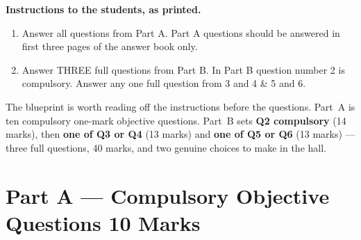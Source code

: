 \documentclass[11pt,a4paper,oneside]{book}
\newenvironment{note}
  {\begin{tcolorbox}[colback=tint,colframe=ocre,boxrule=0.8pt,sharp corners,
     fontupper=\small,breakable,before skip=8pt,after skip=8pt]}
  {\end{tcolorbox}}
\begin{document}
\begin{note}
\textbf{\sffamily Instructions to the students, as printed.}
\begin{enumerate}[leftmargin=1.6em,itemsep=2pt,topsep=4pt]
\item Answer all questions from Part A. Part A questions should be answered in
      first three pages of the answer book only.
\item Answer THREE full questions from Part B. In Part B question number 2 is
      compulsory. Answer any one full question from 3 and 4 \& 5 and 6.
\end{enumerate}
\end{note}

The blueprint is worth reading off the instructions before the questions.
Part~A is ten compulsory one-mark objective questions. Part~B sets
\textbf{Q2 compulsory} (14 marks), then \textbf{one of Q3 or Q4} (13 marks) and
\textbf{one of Q5 or Q6} (13 marks) --- three full questions, 40 marks, and two
genuine choices to make in the hall.

\section[Part A --- Compulsory Objective Questions]{Part A --- Compulsory
  Objective Questions \hfill 10 Marks}
\end{document}
